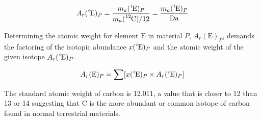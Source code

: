 \begin{equation}\label{eq:atomicweightforisotope}
  A_r(\mathrm { \ce{^i}E })_P =
  \frac{ m_a(\mathrm { \ce{^i}E })_P }{ m_a(\mathrm { \ce{^{12}}C })/12 } =
  \frac{ m_a(\mathrm { \ce{^i}E })_P }{ \si{\dalton} }
\end{equation}

Determining the atomic weight for element $\mathrm E$ in material $P$,
$A_r(\mathrm E)_P$, demands the factoring of the isotopic abundance
$x(\mathrm { \ce{^{i}E} })_P$ and the atomic weight of the given isotope
$A_r(\mathrm { \ce{^i}E })_P$.

\begin{equation}\label{eq:atomicweightforelement}
  A_r(\mathrm E)_P =
  \sum [x(\mathrm { \ce{^i}E })_P \times A_r( \mathrm { \ce{^i}E } )_P]
\end{equation}

The standard atomic weight of carbon is \num{12.011}\cite{atomic-weights-2013},
a value that is closer to \num{12} than \num{13} or \num{14} suggesting that
C is the more abundant or common isotope of carbon found in
normal terrestrial materials.

